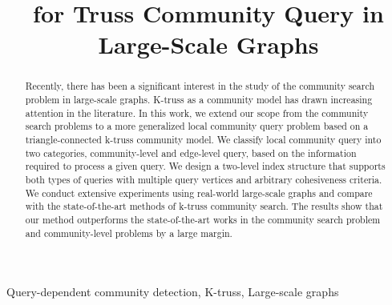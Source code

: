 \documentclass[conference]{IEEEtran}
\newcommand{\toplevelprob}{community-level}
\newcommand{\bottomlevelprob}{edge-level}
\newcommand{\twolevelindex}{two-level index}
\newcommand{\TwoLevelIndex}{\expandafter\capitalisewords\expandafter{\twolevelindex}}
\begin{document}
\title{\TwoLevelIndex{} for Truss Community Query in Large-Scale Graphs}

\author{
}

\maketitle

\begin{abstract}
Recently, there has been a significant interest in the study of the community search problem in large-scale graphs. K-truss as a community model has drawn increasing attention in the literature. In this work, we extend our scope from the community search problems to a more generalized local community query problem based on a triangle-connected k-truss community model. We classify local community query into two categories, \toplevelprob{} and \bottomlevelprob{} query, based on the information required to process a given query. 
We design a two-level index structure that supports both types of queries with multiple query vertices and arbitrary cohesiveness criteria. 
We conduct extensive experiments using real-world large-scale graphs and compare with the state-of-the-art methods of k-truss community search. The results show that our method outperforms the state-of-the-art works in the community search problem and \toplevelprob{} problems by a large margin. 
\end{abstract}

\begin{IEEEkeywords}
Query-dependent community detection, K-truss, Large-scale graphs
\end{IEEEkeywords}











%
\end{document}
